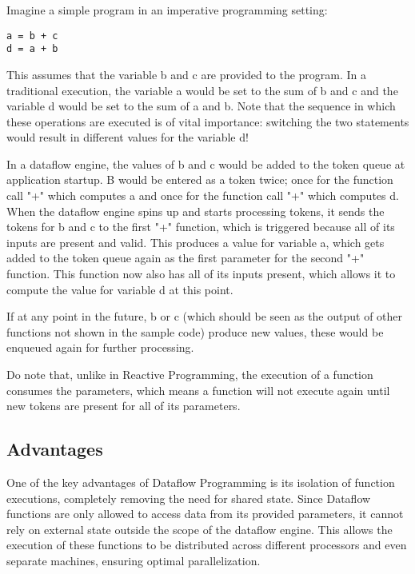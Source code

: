 Imagine a simple program in an imperative programming setting:

\begin{lstlisting}
a = b + c
d = a + b
\end{lstlisting}

This assumes that the variable b and c are provided to the program.
In a traditional execution, the variable a would be set to the sum of b and c and the variable d would be set to the sum of a and b. Note that the sequence in which these operations are executed is of vital importance: switching the two statements would result in different values for the variable d!

In a dataflow engine, the values of b and c would be added to the token queue at application startup. B would be entered as a token twice; once for the function call "+" which computes a and once for the function call "+" which computes d. When the dataflow engine spins up and starts processing tokens, it sends the tokens for b and c to the first "+" function, which is triggered because all of its inputs are present and valid. This produces a value for variable a, which gets added to the token queue again as the first parameter for the second "+" function. This function now also has all of its inputs present, which allows it to compute the value for variable d at this point.

If at any point in the future, b or c (which should be seen as the output of other functions not shown in the sample code) produce new values, these would be enqueued again for further processing.

Do note that, unlike in Reactive Programming, the execution of a function consumes the parameters, which means a function will not execute again until new tokens are present for all of its parameters.

\subsection{Advantages}

One of the key advantages of Dataflow Programming is its isolation of function executions, completely removing the need for shared state. Since Dataflow functions are only allowed to access data from its provided parameters, it cannot rely on external state outside the scope of the dataflow engine. This allows the execution of these functions to be distributed across different processors and even separate machines, ensuring optimal parallelization. 

